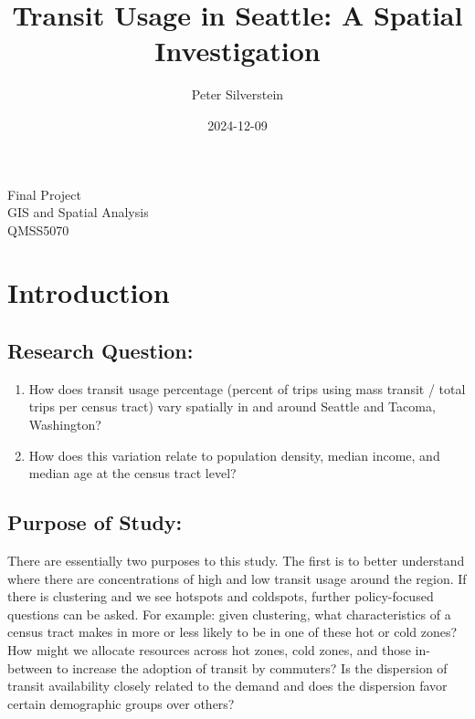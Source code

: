 \documentclass[
]{article}
\title{Transit Usage in Seattle: A Spatial Investigation}
\author{Peter Silverstein}
\date{2024-12-09}
\providecommand{\tightlist}{%
  \setlength{\itemsep}{0pt}\setlength{\parskip}{0pt}}
\begin{document}
\maketitle

\begin{center}
    {\large Final Project}\\[0.5cm]
    {\large GIS and Spatial Analysis}\\[0.5cm]
    {\large QMSS5070}\\[0.5cm]
\end{center}

\newpage

\section{Introduction}\label{introduction}

\subsection{Research Question:}\label{research-question}

\begin{enumerate}
\def\labelenumi{\arabic{enumi}.}
\tightlist
\item
  How does transit usage percentage (percent of trips using mass transit
  / total trips per census tract) vary spatially in and around Seattle
  and Tacoma, Washington?
\item
  How does this variation relate to population density, median income,
  and median age at the census tract level?
\end{enumerate}

\subsection{Purpose of Study:}\label{purpose-of-study}

There are essentially two purposes to this study. The first is to better
understand where there are concentrations of high and low transit usage
around the region. If there is clustering and we see hotspots and
coldspots, further policy-focused questions can be asked. For example:
given clustering, what characteristics of a census tract makes in more
or less likely to be in one of these hot or cold zones? How might we
allocate resources across hot zones, cold zones, and those in-between to
increase the adoption of transit by commuters? Is the dispersion of
transit availability closely related to the demand and does the
dispersion favor certain demographic groups over others?
\end{document}
